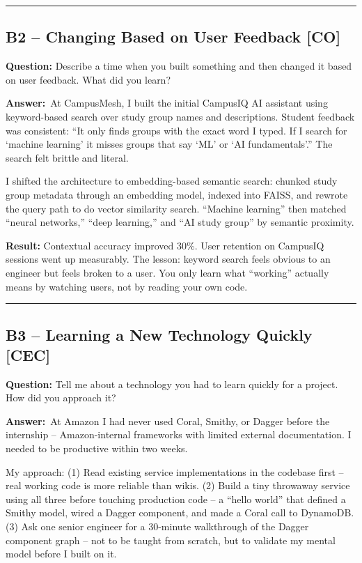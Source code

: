 \documentclass[letterpaper,10pt]{article}
\newlength{\boxwidth}
\newcommand{\bquestionbox}[1]{%
  \vspace{6pt}%
  \noindent\colorbox{bqbg}{%
    \begin{minipage}{\boxwidth}%
      \vspace{3pt}\textbf{\textcolor{orange!70!black}{Question:}} #1\vspace{3pt}%
    \end{minipage}%
  }\vspace{2pt}%
}
\newcommand{\answerlabel}{\noindent\textbf{\textcolor{answerblue}{Answer:}}~}
\begin{document}
\rule{\linewidth}{0.2pt}

\subsection*{B2 -- Changing Based on User Feedback \textmd{[CO]}}

\bquestionbox{Describe a time when you built something and then changed it based on user feedback. What did you learn?}

\answerlabel At CampusMesh, I built the initial CampusIQ AI assistant using keyword-based search over study group names and descriptions. Student feedback was consistent: ``It only finds groups with the exact word I typed. If I search for `machine learning' it misses groups that say `ML' or `AI fundamentals'.'' The search felt brittle and literal.

I shifted the architecture to embedding-based semantic search: chunked study group metadata through an embedding model, indexed into FAISS, and rewrote the query path to do vector similarity search. ``Machine learning'' then matched ``neural networks,'' ``deep learning,'' and ``AI study group'' by semantic proximity.

\textbf{Result:} Contextual accuracy improved 30\%. User retention on CampusIQ sessions went up measurably. The lesson: keyword search feels obvious to an engineer but feels broken to a user. You only learn what ``working'' actually means by watching users, not by reading your own code.

\rule{\linewidth}{0.2pt}

\subsection*{B3 -- Learning a New Technology Quickly \textmd{[CEC]}}

\bquestionbox{Tell me about a technology you had to learn quickly for a project. How did you approach it?}

\answerlabel At Amazon I had never used Coral, Smithy, or Dagger before the internship -- Amazon-internal frameworks with limited external documentation. I needed to be productive within two weeks.

My approach: (1) Read existing service implementations in the codebase first -- real working code is more reliable than wikis. (2) Build a tiny throwaway service using all three before touching production code -- a ``hello world'' that defined a Smithy model, wired a Dagger component, and made a Coral call to DynamoDB. (3) Ask one senior engineer for a 30-minute walkthrough of the Dagger component graph -- not to be taught from scratch, but to validate my mental model before I built on it.
\end{document}
